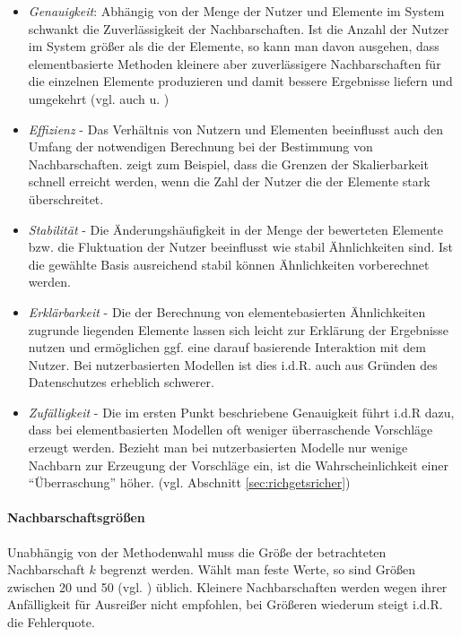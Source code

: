 \begin{itemize}
\item \textit{Genauigkeit}: Abhängig von der Menge der Nutzer und Elemente im System schwankt die Zuverlässigkeit der Nachbarschaften. Ist die Anzahl der Nutzer im System größer als die der Elemente, so kann man davon ausgehen, dass elementbasierte Methoden kleinere aber zuverlässigere Nachbarschaften für die einzelnen Elemente produzieren und damit bessere Ergebnisse liefern und umgekehrt (vgl. auch \citep{Huete:2012:UPA:2206442.2206675} u. \citep{Herlocker:2002:EAD:593967.594047}) 
\item \textit{Effizienz} - Das Verhältnis von Nutzern und Elementen beeinflusst auch den Umfang der notwendigen Berechnung bei der Bestimmung von Nachbarschaften. \citep{linden03} zeigt zum Beispiel, dass die Grenzen der Skalierbarkeit schnell erreicht werden, wenn die Zahl der Nutzer die der Elemente stark überschreitet.
\item \textit{Stabilität} - Die Änderungshäufigkeit in der Menge der bewerteten Elemente bzw. die Fluktuation der Nutzer beeinflusst wie stabil Ähnlichkeiten sind. Ist die gewählte Basis ausreichend stabil können Ähnlichkeiten vorberechnet werden. 
\item \textit{Erklärbarkeit} - Die der Berechnung von elementebasierten Ähnlichkeiten zugrunde liegenden Elemente lassen sich leicht zur Erklärung der Ergebnisse nutzen und ermöglichen ggf. eine darauf basierende Interaktion mit dem Nutzer. Bei nutzerbasierten Modellen ist dies i.d.R. auch aus Gründen des Datenschutzes erheblich schwerer.
\item \textit{Zufälligkeit} - Die im ersten Punkt beschriebene Genauigkeit führt i.d.R dazu, dass bei elementbasierten Modellen oft weniger überraschende Vorschläge erzeugt werden. Bezieht man bei nutzerbasierten Modelle nur wenige Nachbarn zur Erzeugung der Vorschläge ein, ist die Wahrscheinlichkeit einer ``Überraschung'' höher. (vgl. Abschnitt \ref{sec:richgetsricher})
\end{itemize}

\paragraph{Nachbarschaftsgrößen} Unabhängig von der Methodenwahl muss die Größe der betrachteten Nachbarschaft $k$ begrenzt werden. Wählt man feste Werte, so sind Größen zwischen 20 und 50 (vgl. \citep{Herlocker:2002:EAD:593967.594047}) üblich. Kleinere Nachbarschaften werden wegen ihrer Anfälligkeit für Ausreißer nicht empfohlen, bei Größeren wiederum steigt i.d.R. die Fehlerquote. 

